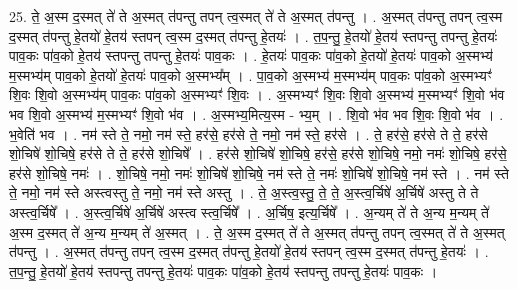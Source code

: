 \documentclass[17pt]{extarticle}
\begin{document}
25. ते॒ अ॒स्म द॒स्मत् ते॑ ते अ॒स्मत् त॑पन्तु तपन् त्व॒स्मत् ते॑ ते अ॒स्मत् त॑पन्तु । . अ॒स्मत् त॑पन्तु तपन् त्व॒स्म द॒स्मत् त॑पन्तु हे॒तयो॑ हे॒तय॑ स्तपन् त्व॒स्म द॒स्मत् त॑पन्तु हे॒तयः॑ । . त॒प॒न्तु॒ हे॒तयो॑ हे॒तय॑ स्तपन्तु तपन्तु हे॒तयः॑ पाव॒कः पा॑व॒को हे॒तय॑ स्तपन्तु तपन्तु हे॒तयः॑ पाव॒कः । . हे॒तयः॑ पाव॒कः पा॑व॒को हे॒तयो॑ हे॒तयः॑ पाव॒को अ॒स्मभ्य॑ म॒स्मभ्य॑म् पाव॒को हे॒तयो॑ हे॒तयः॑ पाव॒को अ॒स्मभ्य᳚म् । . पा॒व॒को अ॒स्मभ्य॑ म॒स्मभ्य॑म् पाव॒कः पा॑व॒को अ॒स्मभ्यꣳ॑ शि॒वः शि॒वो अ॒स्मभ्य॑म् पाव॒कः पा॑व॒को अ॒स्मभ्यꣳ॑ शि॒वः । . अ॒स्मभ्यꣳ॑ शि॒वः शि॒वो अ॒स्मभ्य॑ म॒स्मभ्यꣳ॑ शि॒वो भ॑व भव शि॒वो अ॒स्मभ्य॑ म॒स्मभ्यꣳ॑ शि॒वो भ॑व । . अ॒स्मभ्य॒मित्य॒स्म - भ्य॒म् । . शि॒वो भ॑व भव शि॒वः शि॒वो भ॑व । . भ॒वेति॑ भव । . नम॑ स्ते ते॒ नमो॒ नम॑ स्ते॒ हर॑से॒ हर॑से ते॒ नमो॒ नम॑ स्ते॒ हर॑से । . ते॒ हर॑से॒ हर॑से ते ते॒ हर॑से शो॒चिषे॑ शो॒चिषे॒ हर॑से ते ते॒ हर॑से शो॒चिषे᳚ । . हर॑से शो॒चिषे॑ शो॒चिषे॒ हर॑से॒ हर॑से शो॒चिषे॒ नमो॒ नमः॑ शो॒चिषे॒ हर॑से॒ हर॑से शो॒चिषे॒ नमः॑ । . शो॒चिषे॒ नमो॒ नमः॑ शो॒चिषे॑ शो॒चिषे॒ नम॑ स्ते ते॒ नमः॑ शो॒चिषे॑ शो॒चिषे॒ नम॑ स्ते । . नम॑ स्ते ते॒ नमो॒ नम॑ स्ते अस्त्वस्तु ते॒ नमो॒ नम॑ स्ते अस्तु । . ते॒ अ॒स्त्व॒स्तु॒ ते॒ ते॒ अ॒स्त्व॒र्चिषे॑ अ॒र्चिषे॑ अस्तु ते ते अस्त्व॒र्चिषे᳚ । . अ॒स्त्व॒र्चिषे॑ अ॒र्चिषे॑ अस्त्व स्त्व॒र्चिषे᳚ । . अ॒र्चिष॒ इत्य॒र्चिषे᳚ । . अ॒न्यम् ते॑ ते अ॒न्य म॒न्यम् ते॑ अ॒स्म द॒स्मत् ते॑ अ॒न्य म॒न्यम् ते॑ अ॒स्मत् । . ते॒ अ॒स्म द॒स्मत् ते॑ ते अ॒स्मत् त॑पन्तु तपन् त्व॒स्मत् ते॑ ते अ॒स्मत् त॑पन्तु । . अ॒स्मत् त॑पन्तु तपन् त्व॒स्म द॒स्मत् त॑पन्तु हे॒तयो॑ हे॒तय॑ स्तपन् त्व॒स्म द॒स्मत् त॑पन्तु हे॒तयः॑ । . त॒प॒न्तु॒ हे॒तयो॑ हे॒तय॑ स्तपन्तु तपन्तु हे॒तयः॑ पाव॒कः पा॑व॒को हे॒तय॑ स्तपन्तु तपन्तु हे॒तयः॑ पाव॒कः । \newline
\end{document}
